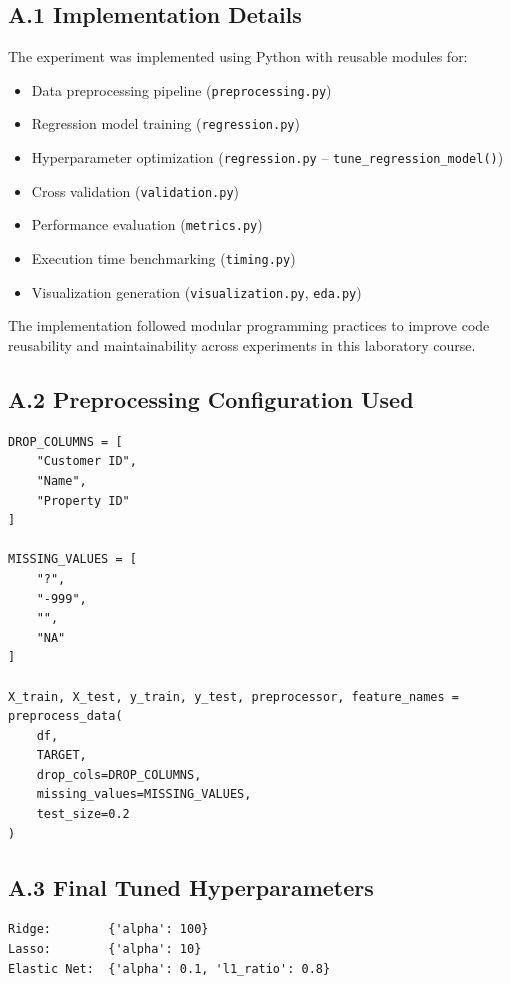 \documentclass[12pt,a4paper]{article}
\begin{document}
\subsection*{A.1 Implementation Details}

The experiment was implemented using Python with reusable modules for:
\begin{itemize}
\item Data preprocessing pipeline (\texttt{preprocessing.py})
\item Regression model training (\texttt{regression.py})
\item Hyperparameter optimization (\texttt{regression.py} -- \texttt{tune\_regression\_model()})
\item Cross validation (\texttt{validation.py})
\item Performance evaluation (\texttt{metrics.py})
\item Execution time benchmarking (\texttt{timing.py})
\item Visualization generation (\texttt{visualization.py}, \texttt{eda.py})
\end{itemize}

The implementation followed modular programming practices to improve code reusability and maintainability across experiments in this laboratory course.

\subsection*{A.2 Preprocessing Configuration Used}

\begin{lstlisting}
DROP_COLUMNS = [
    "Customer ID",
    "Name",
    "Property ID"
]

MISSING_VALUES = [
    "?",
    "-999",
    "",
    "NA"
]

X_train, X_test, y_train, y_test, preprocessor, feature_names = preprocess_data(
    df,
    TARGET,
    drop_cols=DROP_COLUMNS,
    missing_values=MISSING_VALUES,
    test_size=0.2
)
\end{lstlisting}

\subsection*{A.3 Final Tuned Hyperparameters}

\begin{lstlisting}
Ridge:        {'alpha': 100}
Lasso:        {'alpha': 10}
Elastic Net:  {'alpha': 0.1, 'l1_ratio': 0.8}
\end{lstlisting}
\end{document}
